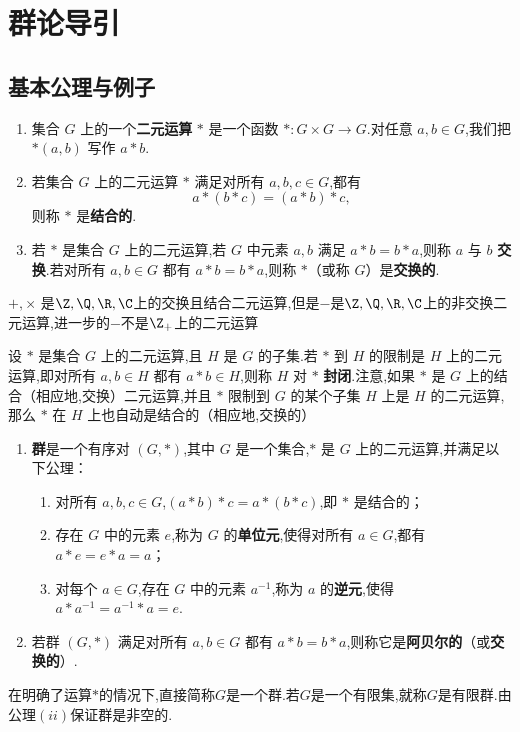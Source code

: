 \setchapterimage{}
\chapter{群论导引}
\section{基本公理与例子}
\begin{definition}
	\begin{enumerate}
		\item 集合 $G$ 上的一个\textbf{二元运算} $*$ 是一个函数 $*:G\times G\to G$.对任意 $a,b\in G$,我们把 $*(a,b)$ 写作 $a*b$.
		\item 若集合 $G$ 上的二元运算 $*$ 满足对所有 $a,b,c\in G$,都有
		\[
		a*(b*c)=(a*b)*c,
		\]
		则称 $*$ 是\textbf{结合的}.
		\item 若 $*$ 是集合 $G$ 上的二元运算,若 $G$ 中元素 $a,b$ 满足 $a*b=b*a$,则称 $a$ 与 $b$ \textbf{交换}.若对所有 $a,b\in G$ 都有 $a*b=b*a$,则称 $*$（或称 $G$）是\textbf{交换的}.
	\end{enumerate}
\end{definition}
\begin{example}
	$+,\times$ 是$\Z,\Q,\R,\C$上的交换且结合二元运算,但是$-$是$\Z,\Q,\R,\C$上的非交换二元运算,进一步的$-$不是$\Z_+$上的二元运算
\end{example}
设 $*$ 是集合 $G$ 上的二元运算,且 $H$ 是 $G$ 的子集.若 $*$ 到 $H$ 的限制是 $H$ 上的二元运算,即对所有 $a,b\in H$ 都有 $a*b\in H$,则称 $H$ 对 $*$ \textbf{封闭}.注意,如果 $*$ 是 $G$ 上的结合（相应地,交换）二元运算,并且 $*$ 限制到 $G$ 的某个子集 $H$ 上是 $H$ 的二元运算,那么 $*$ 在 $H$ 上也自动是结合的（相应地,交换的）


\begin{definition}
	\begin{enumerate}[label=(\arabic*)]
	\item \textbf{群}是一个有序对 $(G,*)$,其中 $G$ 是一个集合,$*$ 是 $G$ 上的二元运算,并满足以下公理：
	\begin{enumerate}[label=(\roman*)]
		\item 对所有 $a,b,c\in G$,$(a*b)*c=a*(b*c)$,即 $*$ 是结合的；
		\item 存在 $G$ 中的元素 $e$,称为 $G$ 的\textbf{单位元},使得对所有 $a\in G$,都有 $a*e=e*a=a$；
		\item 对每个 $a\in G$,存在 $G$ 中的元素 $a^{-1}$,称为 $a$ 的\textbf{逆元},使得 $a*a^{-1}=a^{-1}*a=e$.
	\end{enumerate}
	\item 若群 $(G,*)$ 满足对所有 $a,b\in G$ 都有 $a*b=b*a$,则称它是\textbf{阿贝尔的}（或\textbf{交换的}）.
\end{enumerate}

\end{definition}
在明确了运算$*$的情况下,直接简称$G$是一个群.若$G$是一个有限集,就称$G$是有限群.由公理$(ii)$保证群是非空的.

